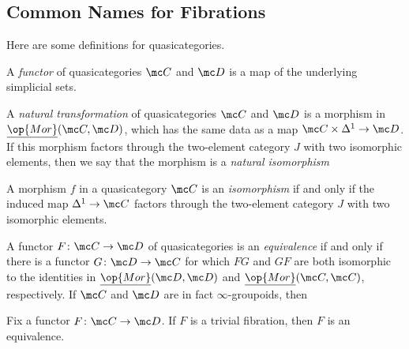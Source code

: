 \documentclass[../notes.tex]{subfiles}
\begin{document}
\subsection{Common Names for Fibrations}
Here are some definitions for quasicategories.
\begin{definition}[functor]
	A \textit{functor} of quasicategories $\mc C$ and $\mc D$ is a map of the underlying simplicial sets.
\end{definition}
\begin{definition}
	A \textit{natural transformation} of quasicategories $\mc C$ and $\mc D$ is a morphism in $\underline{\op{Mor}}(\mc C,\mc D)$, which has the same data as a map $\mc C\times\Delta^1\to\mc D$. If this morphism factors through the two-element category $J$ with two isomorphic elements, then we say that the morphism is a \textit{natural isomorphism}
\end{definition}
\begin{definition}[isomorphism]
	A morphism $f$ in a quasicategory $\mc C$ is an \textit{isomorphism} if and only if the induced map $\Delta^1\to\mc C$ factors through the two-element category $J$ with two isomorphic elements.
\end{definition}
\begin{definition}[equivalence]
	A functor $F\colon\mc C\to\mc D$ of quasicategories is an \textit{equivalence} if and only if there is a functor $G\colon\mc D\to\mc C$ for which $FG$ and $GF$ are both isomorphic to the identities in $\underline{\op{Mor}}(\mc D,\mc D)$ and $\underline{\op{Mor}}(\mc C,\mc C)$, respectively. If $\mc C$ and $\mc D$ are in fact $\infty$-groupoids, then 
\end{definition}
\begin{proposition} \label{prop:triv-fibration-to-equiv}
	Fix a functor $F\colon\mc C\to\mc D$. If $F$ is a trivial fibration, then $F$ is an equivalence.
\end{proposition}
\end{document}
